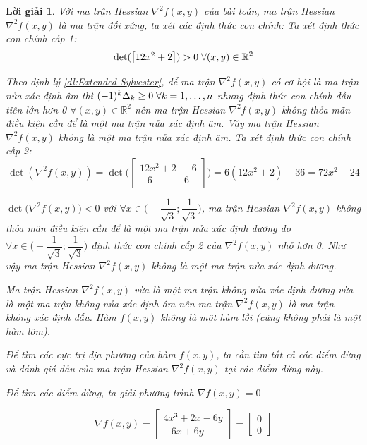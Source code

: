 \documentclass[14pt, a4paper]{article}
\theoremstyle{sltheorem}
\theoremstyle{soltheorem}
\newtheorem*{loigiai}{Lời giải}
\begin{document}
\begin{loigiai}
        Với ma trận Hessian $\nabla^2 f(x, y)$ của bài toán, ma trận Hessian $\nabla^2 f(x, y)$ là ma trận đối xứng, ta xét các định thức con chính:
        Ta xét định thức con chính cấp 1:
        \begin{equation*}
            \det(\begin{bmatrix} 12x^2 + 2  \end{bmatrix})>0 \thickspace \forall (x, y) \in \mathbb{R}^2
        \end{equation*}

        Theo định lý \ref{dl:Extended-Sylvester}, để ma trận $\nabla^2 f(x, y)$ có cơ hội là ma trận nửa xác định âm thì $(-1)^k \Delta_k \geq 0 \thickspace \forall k = 1,\dots,n$ nhưng định thức con chính đầu tiên lớn hơn 0 $\forall (x, y) \in \mathbb{R}^2$ nên ma trận Hessian $\nabla^2 f(x, y)$ không thỏa mãn điều kiện cần để là một ma trận nửa xác định âm.
        Vậy ma trận Hessian $\nabla^2 f(x, y)$ không là một ma trận nửa xác định âm.
        Ta xét định thức con chính cấp 2:
        \begin{equation*}
            \det(\nabla^2 f(x,y))=\det\Bigg(\begin{bmatrix} 12x^2 + 2 & -6 \\ -6 & 6 \end{bmatrix} \Bigg)=6(12x^2 + 2) - 36 =72x^2 - 24
        \end{equation*}

        $\det\Big(\nabla^2 f(x,y)\Big) < 0$ với $\forall x \in \Big(-\dfrac{1}{\sqrt{3}}; \dfrac{1}{\sqrt{3}}\Big)$, 
        ma trận Hessian $\nabla^2 f(x,y)$ không thỏa mãn điều kiện cần để là một ma trận nửa xác định dương do $\forall x \in \Big(-\dfrac{1}{\sqrt{3}}; \dfrac{1}{\sqrt{3}}\Big)$ định thức con chính cấp 2 của $\nabla^2 f(x, y)$ nhỏ hơn 0.
        Như vậy ma trận Hessian $\nabla^2 f(x,y)$ không là một ma trận nửa xác định dương.


        Ma trận Hessian $\nabla^2 f(x,y)$ vừa là một ma trận không nửa xác định dương vừa là một ma trận không nửa xác định âm nên ma trận $\nabla^2 f(x,y)$ là ma trận không xác định dấu. Hàm $f(x, y)$ không là một hàm lồi (cũng không phải là một hàm lõm).

        Để tìm các cực trị địa phương của hàm $f(x, y)$, ta cần tìm tất cả các điểm dừng và đánh giá dấu của ma trận Hessian $\nabla^2 f(x,y)$ tại các điểm dừng này.
        
        Để tìm các điểm dừng, ta giải phương trình $\nabla f(x, y) = 0$

        \begin{equation*}
            \nabla f(x, y) = \begin{bmatrix} 4x^3 + 2x - 6y \\ -6x + 6y \end{bmatrix} = \begin{bmatrix} 0 \\ 0 \end{bmatrix}
        \end{equation*}


\end{loigiai}
\end{document}
